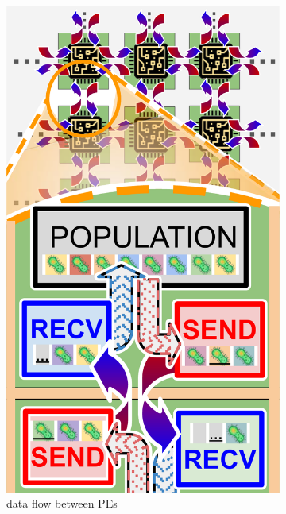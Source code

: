 \begin{figure}[t!]
  \centering
  \begin{subfigure}{0.5\linewidth}
    \centering
    \footnotesize
    \includegraphics[width=0.8\linewidth]{img/dataflow-schematic}
    \vspace{-0.05in}
    \caption{data flow between PEs}
    \label{fig:async-ga-schematic-dataflow}
  \end{subfigure}%
  \begin{subfigure}{0.5\linewidth}
    \footnotesize
    \centering

\end{subfigure}
\end{figure}
